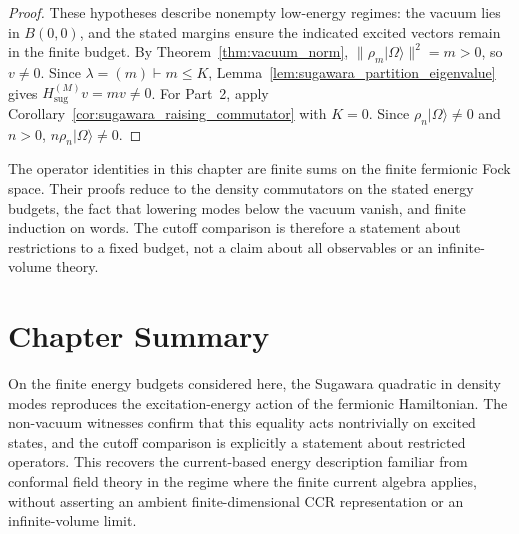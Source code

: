 \begin{proof}
These hypotheses describe nonempty low-energy regimes: the vacuum lies in $B(0,0)$, and the stated margins ensure the indicated excited vectors remain in the finite budget. By Theorem~\ref{thm:vacuum_norm}, $\|\rho_m |\Omega\rangle\|^2 = m > 0$, so $v \neq 0$. Since $\lambda = (m) \vdash m \le K$, Lemma~\ref{lem:sugawara_partition_eigenvalue} gives $H_{\mathrm{sug}}^{(M)} v = m v \neq 0$. For Part~2, apply Corollary~\ref{cor:sugawara_raising_commutator} with $K=0$. Since $\rho_n |\Omega\rangle \neq 0$ and $n > 0$, $n \rho_n |\Omega\rangle \neq 0$.
\end{proof}

\begin{remark}
The operator identities in this chapter are finite sums on the finite fermionic Fock space. Their proofs reduce to the density commutators on the stated energy budgets, the fact that lowering modes below the vacuum vanish, and finite induction on words. The cutoff comparison is therefore a statement about restrictions to a fixed budget, not a claim about all observables or an infinite-volume theory.
\end{remark}


\section{Chapter Summary}
On the finite energy budgets considered here, the Sugawara quadratic in
density modes reproduces the excitation-energy action of the fermionic
Hamiltonian. The non-vacuum witnesses confirm that this equality acts
nontrivially on excited states, and the cutoff comparison is explicitly a
statement about restricted operators. This recovers the current-based
energy description familiar from conformal field theory in the regime
where the finite current algebra applies, without asserting an ambient
finite-dimensional CCR representation or an infinite-volume limit.
